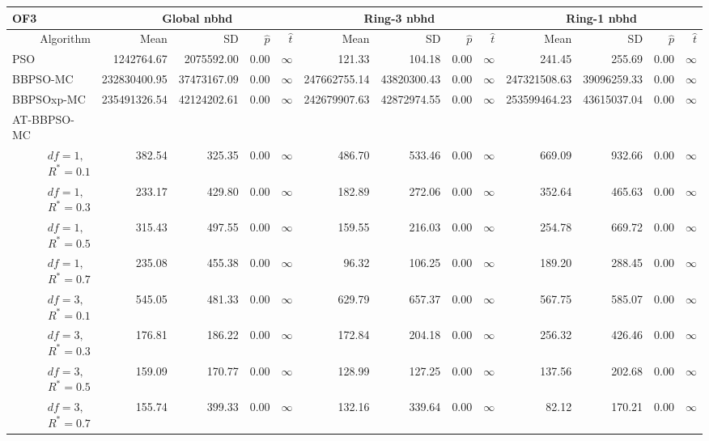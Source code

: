 \documentclass[cmbright]{staauth}
\begin{document}
\begin{table}[ht]
\centering
\tiny{
\begin{tabular}{r|rrrr|rrrr|rrrr}
\multicolumn{1}{l}{OF3} & \multicolumn{4}{c}{Global nbhd} & \multicolumn{4}{c}{Ring-3 nbhd} & \multicolumn{4}{c}{Ring-1 nbhd}\\
  \hline
Algorithm & Mean & SD & $\widehat{p}$ & $\widehat{t}$ & Mean & SD & $\widehat{p}$ & $\widehat{t}$ & Mean & SD & $\widehat{p}$ & $\widehat{t}$ \\
  \hline
\multicolumn{1}{l|}{PSO} & 1242764.67 & 2075592.00 & 0.00 & $\infty$ & 121.33 & 104.18 & 0.00 & $\infty$ & 241.45 & 255.69 & 0.00 & $\infty$ \\
  \multicolumn{1}{l|}{BBPSO-MC} & 232830400.95 & 37473167.09 & 0.00 & $\infty$ & 247662755.14 & 43820300.43 & 0.00 & $\infty$ & 247321508.63 & 39096259.33 & 0.00 & $\infty$ \\
  \multicolumn{1}{l|}{BBPSOxp-MC} & 235491326.54 & 42124202.61 & 0.00 & $\infty$ & 242679907.63 & 42872974.55 & 0.00 & $\infty$ & 253599464.23 & 43615037.04 & 0.00 & $\infty$ \\
\hline
\multicolumn{1}{l|}{AT-BBPSO-MC} &&&&&&&&&&&&\\
  $df = 1,\enspace$ $R^* =0.1$ & 382.54 & 325.35 & 0.00 & $\infty$ & 486.70 & 533.46 & 0.00 & $\infty$ & 669.09 & 932.66 & 0.00 & $\infty$ \\
  $df = 1,\enspace$ $R^* =0.3$ & 233.17 & 429.80 & 0.00 & $\infty$ & 182.89 & 272.06 & 0.00 & $\infty$ & 352.64 & 465.63 & 0.00 & $\infty$ \\
  $df = 1,\enspace$ $R^* =0.5$ & 315.43 & 497.55 & 0.00 & $\infty$ & 159.55 & 216.03 & 0.00 & $\infty$ & 254.78 & 669.72 & 0.00 & $\infty$ \\
  $df = 1,\enspace$ $R^* =0.7$ & 235.08 & 455.38 & 0.00 & $\infty$ & 96.32 & 106.25 & 0.00 & $\infty$ & 189.20 & 288.45 & 0.00 & $\infty$ \\
  $df = 3,\enspace$ $R^* =0.1$ & 545.05 & 481.33 & 0.00 & $\infty$ & 629.79 & 657.37 & 0.00 & $\infty$ & 567.75 & 585.07 & 0.00 & $\infty$ \\
  $df = 3,\enspace$ $R^* =0.3$ & 176.81 & 186.22 & 0.00 & $\infty$ & 172.84 & 204.18 & 0.00 & $\infty$ & 256.32 & 426.46 & 0.00 & $\infty$ \\
  $df = 3,\enspace$ $R^* =0.5$ & 159.09 & 170.77 & 0.00 & $\infty$ & 128.99 & 127.25 & 0.00 & $\infty$ & 137.56 & 202.68 & 0.00 & $\infty$ \\
  $df = 3,\enspace$ $R^* =0.7$ & 155.74 & 399.33 & 0.00 & $\infty$ & 132.16 & 339.64 & 0.00 & $\infty$ & 82.12 & 170.21 & 0.00 & $\infty$ \\

\end{tabular}}
\end{table}
\end{document}
